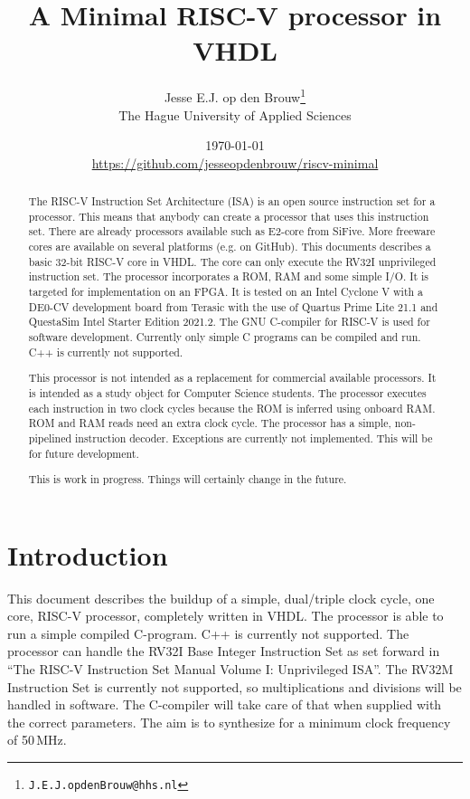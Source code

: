 \documentclass[12pt]{article}
\author{Jesse E.J. op den Brouw\thanks{\texttt{J.E.J.opdenBrouw@hhs.nl}}\\[2ex]The Hague University of Applied Sciences}
\title{A Minimal RISC-V processor in VHDL}
\date{\today\\[2ex]\normalsize\url{https://github.com/jesseopdenbrouw/riscv-minimal}}
\begin{document}
\maketitle

\vfill
\begin{abstract}
\noindent
The RISC-V Instruction Set Architecture (ISA) is an open source instruction set for a processor. This means that anybody can create a processor that uses this instruction set. There are already processors available such as E2-core from SiFive. More freeware cores are available on several platforms (e.g. on GitHub). This documents describes a basic 32-bit RISC-V core in VHDL. The core can only execute the RV32I unprivileged instruction set. The processor incorporates a ROM, RAM and some simple I/O. It is targeted for implementation on an FPGA. It is tested on an Intel Cyclone V with a DE0-CV development board from Terasic with the use of Quartus Prime Lite 21.1 and QuestaSim Intel Starter Edition 2021.2. The GNU C-compiler for RISC-V is used for software development. Currently only simple C programs can be compiled and run. C++ is currently not supported.

\noindent
This processor is not intended as a replacement for commercial available processors. It is intended as a study object for Computer Science students. The processor executes each instruction in two clock cycles because the ROM is inferred using onboard RAM. ROM and RAM reads need an extra clock cycle. The processor has a simple, non-pipelined instruction decoder. Exceptions are currently not implemented. This will be for future development.

\noindent
This is work in progress. Things will certainly change in the future.
\end{abstract}
\vfill

\clearpage
\tableofcontents

\clearpage
\section{Introduction}
This document describes the buildup of a simple, dual/triple clock cycle, one core, RISC-V processor, completely written in VHDL. The processor is able to run a simple compiled C-program. C++ is currently not supported. The processor can handle the RV32I Base Integer Instruction Set as set forward in ``The RISC-V Instruction Set Manual Volume I: Unprivileged ISA''. The RV32M Instruction Set is currently not supported, so multiplications and divisions will be handled in software. The C-compiler will take care of that when supplied with the correct parameters. The aim is to synthesize for a minimum clock frequency of 50\,MHz.
\end{document}
